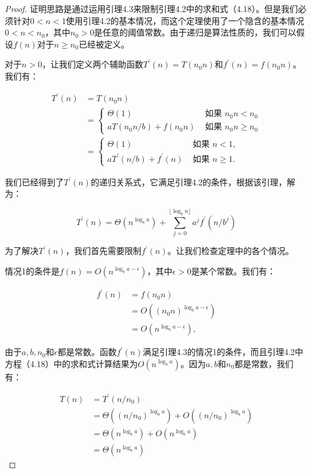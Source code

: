 \documentclass[lang=cn,newtx,10pt,scheme=chinese]{elegantbook}
\begin{document}
\begin{proof}
证明思路是通过运用引理4.3来限制引理4.2中的求和式（4.18）。但是我们必须针对$0<n<1$使用引理4.2的基本情况，而这个定理使用了一个隐含的基本情况$0<n<n_0$，其中$n_0>0$是任意的阈值常数。由于递归是算法性质的，我们可以假设$f(n)$对于$n \geq n_0$已经被定义。

对于$n>0$，让我们定义两个辅助函数$T^{\prime}(n)=T(n_0 n)$和$f^{\prime}(n)=f(n_0 n)$。我们有：

\begin{equation}
\begin{aligned}
T^{\prime}(n) & =T(n_0 n) \\
& = \begin{cases}\Theta(1) & \text { 如果 } n_0 n<n_0 \\
a T(n_0 n / b)+f(n_0 n) & \text { 如果 } n_0 n \geq n_0\end{cases} \\
& = \begin{cases}\Theta(1) & \text { 如果 } n<1, \\
a T^{\prime}(n / b)+f^{\prime}(n) & \text { 如果 } n \geq 1 .\end{cases}
\end{aligned}
\end{equation}

我们已经得到了$T^{\prime}(n)$的递归关系式，它满足引理4.2的条件，根据该引理，解为：

\begin{equation}
T^{\prime}(n)=\Theta(n^{\log _b a})+\sum_{j=0}^{\lfloor\log _b n\rfloor} a^j f^{\prime}(n / b^j)
\end{equation}

为了解决$T^{\prime}(n)$，我们首先需要限制$f^{\prime}(n)$。让我们检查定理中的各个情况。

情况1的条件是$f(n)=O(n^{\log _b a-\epsilon})$，其中$\epsilon>0$是某个常数。我们有：

$$
\begin{aligned}
f^{\prime}(n) & =f(n_0 n) \\
& =O((n_0 n)^{\log _b a-\epsilon}) \\
& =O(n^{\log _b a-\epsilon}),
\end{aligned}
$$

由于$a, b, n_0$和$\epsilon$都是常数。函数$f^{\prime}(n)$满足引理4.3的情况1的条件，而且引理4.2中方程（4.18）中的求和式计算结果为$O(n^{\log _b a})$。因为$a, b$和$n_0$都是常数，我们有：

$$
\begin{aligned}
T(n) & =T^{\prime}(n / n_0) \\
& =\Theta((n / n_0)^{\log _b a})+O((n / n_0)^{\log _b a}) \\
& =\Theta(n^{\log _b a})+O(n^{\log _b a}) \\
& =\Theta(n^{\log _b a})
\end{aligned}
$$


\end{proof}
\end{document}
